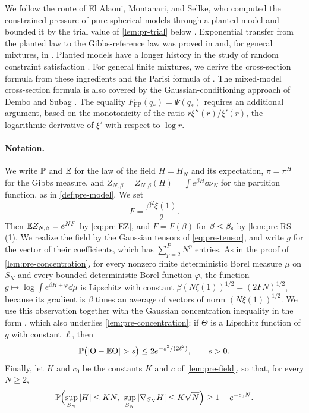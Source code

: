 We follow the route of El Alaoui, Montanari, and Sellke, who computed the constrained pressure of pure spherical models through a planted model \cite[Propositions~3.7 and~3.8]{ElAlaouiMontanariSellke2025} and bounded it by the trial value of \cref{lem:pr-trial} below \cite[Proposition~3.9]{ElAlaouiMontanariSellke2025}. Exponential transfer from the planted law to the Gibbs-reference law was proved in \cite[Lemma~3.5]{ElAlaouiMontanariSellke2025} and, for general mixtures, in \cite[Lemma~2.3]{AuffingerElAlaouiSellke2025}. Planted models have a longer history in the study of random constraint satisfaction \cite{AchlioptasCojaOghlan2008,KrzakalaZdeborova2009}. For general finite mixtures, we derive the cross-section formula from these ingredients and the Parisi formula of \cite{Chen2013}. The mixed-model cross-section formula is also covered by the Gaussian-conditioning approach of Dembo and Subag \cite[Section~2.2, Corollary~2.1]{DemboSubag2026}. The equality $F_{\mathrm{FP}}(q_*)=\Psi(q_*)$ requires an additional argument, based on the monotonicity of the ratio $r\xi''(r)/\xi'(r)$, the logarithmic derivative of $\xi'$ with respect to $\log r$.

\paragraph{Notation.}
We write $\mathbb P$ and $\mathbb E$ for the law of the field $H=H_N$ and its expectation, $\pi=\pi^H$ for the Gibbs measure, and $Z_{N,\beta}=Z_{N,\beta}(H)=\int e^{\beta H}\dd\nu_N$ for the partition function, as in \cref{def:pre-model}. We set
\begin{equation}\label{eq:pr-F}
F=\frac{\beta^2\xi(1)}{2}.
\end{equation}
Then $\mathbb E Z_{N,\beta}=e^{NF}$ by \eqref{eq:pre-EZ}, and $F=F(\beta)$ for $\beta<\beta_{\mathrm s}$ by \cref{lem:pre-RS}(1). We realize the field by the Gaussian tensors of \eqref{eq:pre-tensor}, and write $g$ for the vector of their coefficients, which has $\sum_{p=2}^PN^p$ entries. As in the proof of \cref{lem:pre-concentration}, for every nonzero finite deterministic Borel measure $\mu$ on $S_N$ and every bounded deterministic Borel function $\varphi$, the function $g\mapsto\log\int e^{\beta H+\varphi}\dd\mu$ is Lipschitz with constant $\beta(N\xi(1))^{1/2}=(2FN)^{1/2}$, because its gradient is $\beta$ times an average of vectors of norm $(N\xi(1))^{1/2}$. We use this observation together with the Gaussian concentration inequality in the form \cite[Proposition~4.1 and (4.1)]{LedouxSemigroup1994}, which also underlies \cref{lem:pre-concentration}: if $\Theta$ is a Lipschitz function of $g$ with constant $\ell$, then
\begin{equation}\label{eq:pr-gaussconc}
\Pp\bigl(|\Theta-\E\Theta|>s\bigr)\le 2e^{-s^2/(2\ell^2)},\qquad s>0.
\end{equation}
Finally, let $K$ and $c_0$ be the constants $K$ and $c$ of \cref{lem:pre-field}, so that, for every $N\ge2$,
\begin{equation}\label{eq:pr-fieldK}
\mathbb P\Bigl(\sup_{S_N}|H|\le KN,\ \sup_{S_N}|\nabla_{S_N}H|\le K\sqrt N\Bigr)\ge1-e^{-c_0N}.
\end{equation}


